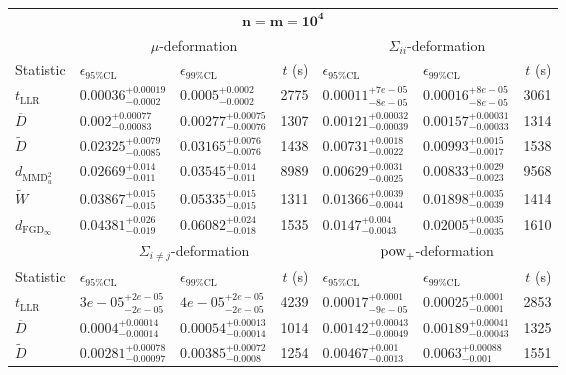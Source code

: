 \begin{tabular}{l|llr|llr}
	\toprule
	\multicolumn{7}{c}{$\mathbf{n=m=10^{4}}$} \\
	\multicolumn{1}{c}{} & \multicolumn{3}{c}{$\mu$-deformation} & \multicolumn{3}{c}{$\Sigma_{ii}$-deformation} \\
	Statistic & $\epsilon_{95\%\mathrm{CL}}$ & $\epsilon_{99\%\mathrm{CL}}$ & $t$ (s) & $\epsilon_{95\%\mathrm{CL}}$ & $\epsilon_{99\%\mathrm{CL}}$ & $t$ (s) \\
	\midrule
	$t_{\mathrm{LLR}}$ & $0.00036_{-0.0002}^{+0.00019}$ & $0.0005_{-0.0002}^{+0.0002}$ & 2775 & $0.00011_{-8e-05}^{+7e-05}$ & $0.00016_{-8e-05}^{+8e-05}$ & 3061 \\
	$\overline{D}$ & $0.002_{-0.00083}^{+0.00077}$ & $0.00277_{-0.00076}^{+0.00075}$ & 1307 & $0.00121_{-0.00039}^{+0.00032}$ & $0.00157_{-0.00033}^{+0.00031}$ & 1314 \\
	$\widetilde{D}$ & $0.02325_{-0.0085}^{+0.0079}$ & $0.03165_{-0.0076}^{+0.0076}$ & 1438 & $0.00731_{-0.0022}^{+0.0018}$ & $0.00993_{-0.0017}^{+0.0015}$ & 1538 \\
	$d_{\mathrm{MMD}^{2}_{u}}$ & $0.02669_{-0.011}^{+0.014}$ & $0.03545_{-0.011}^{+0.014}$ & 8989 & $0.00629_{-0.0025}^{+0.0031}$ & $0.00833_{-0.0023}^{+0.0029}$ & 9568 \\
	$\widetilde{W}$ & $0.03867_{-0.015}^{+0.015}$ & $0.05335_{-0.015}^{+0.015}$ & 1311 & $0.01366_{-0.0044}^{+0.0039}$ & $0.01898_{-0.0039}^{+0.0035}$ & 1414 \\
	$d_{\mathrm{FGD}_{\infty}}$ & $0.04381_{-0.019}^{+0.026}$ & $0.06082_{-0.018}^{+0.024}$ & 1535 & $0.0147_{-0.0043}^{+0.004}$ & $0.02005_{-0.0035}^{+0.0035}$ & 1610 \\
	\toprule
	\multicolumn{1}{c}{} & \multicolumn{3}{c}{$\Sigma_{i\neq j}$-deformation} & \multicolumn{3}{c}{$\rm{pow}_{+}$-deformation} \\
	Statistic & $\epsilon_{95\%\mathrm{CL}}$ & $\epsilon_{99\%\mathrm{CL}}$ & $t$ (s) & $\epsilon_{95\%\mathrm{CL}}$ & $\epsilon_{99\%\mathrm{CL}}$ & $t$ (s) \\
	\midrule
	$t_{\mathrm{LLR}}$ & $3e-05_{-2e-05}^{+2e-05}$ & $4e-05_{-2e-05}^{+2e-05}$ & 4239 & $0.00017_{-9e-05}^{+0.0001}$ & $0.00025_{-0.0001}^{+0.0001}$ & 2853 \\
	$\overline{D}$ & $0.0004_{-0.00014}^{+0.00014}$ & $0.00054_{-0.00014}^{+0.00013}$ & 1014 & $0.00142_{-0.00049}^{+0.00043}$ & $0.00189_{-0.00043}^{+0.00041}$ & 1325 \\
	$\widetilde{D}$ & $0.00281_{-0.00097}^{+0.00078}$ & $0.00385_{-0.0008}^{+0.00072}$ & 1254 & $0.00467_{-0.0013}^{+0.001}$ & $0.0063_{-0.001}^{+0.00088}$ & 1551 \\

\end{tabular}
